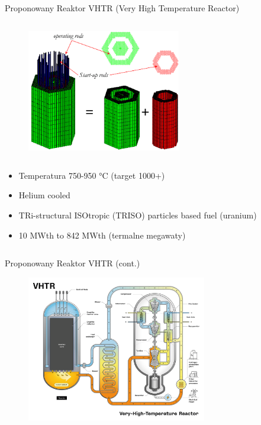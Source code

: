 \begin{columnframe}{Proponowany Reaktor VHTR (Very High Temperature Reactor)}
    \begin{column}{0.5\textwidth}
        \begin{figure}
            \centering
            \includegraphics[width=0.6\textwidth, frame]{images/vhtr_core.png}
        \end{figure}
    \end{column}
    \begin{column}{0.5\textwidth}
        \begin{itemize}
            \item Temperatura 750-950 \si{\degreeCelsius} (target 1000+)
            \item Helium cooled
            \item TRi-structural ISOtropic (TRISO) particles based fuel (uranium)
            \item 10 MWth to 842 MWth (termalne megawaty)
        \end{itemize}
    \end{column}
\end{columnframe}

\begin{frame}{Proponowany Reaktor VHTR (cont.)}
    \begin{figure}
        \centering
        \includegraphics[width=0.7\textwidth, frame]{images/VHTR.png}
    \end{figure}
\end{frame}

